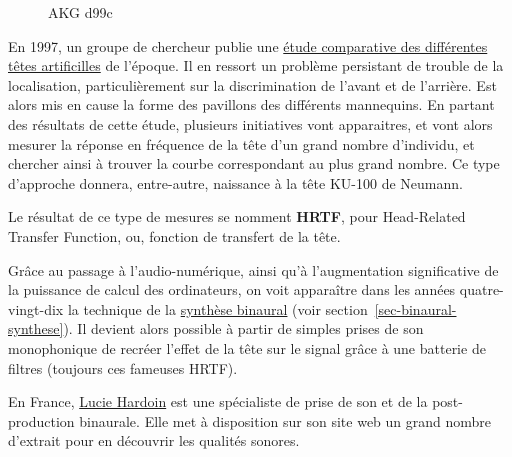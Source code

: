 \documentclass[
  letterpaper,
  DIV=11,
  numbers=noendperiod]{scrreprt}
\begin{document}
\begin{figure}
\begin{minipage}[b]{0.33\linewidth}
{{}

\caption{AKG d99c}

}

\end{minipage}%

\end{figure}

En 1997, un groupe de chercheur publie une
\href{https://www.aes.org/e-lib/browse.cfm?elib=7375}{étude comparative
des différentes têtes artificilles} de l'époque. Il en ressort un
problème persistant de trouble de la localisation, particulièrement sur
la discrimination de l'avant et de l'arrière. Est alors mis en cause la
forme des pavillons des différents mannequins. En partant des résultats
de cette étude, plusieurs initiatives vont apparaitres, et vont alors
mesurer la réponse en fréquence de la tête d'un grand nombre d'individu,
et chercher ainsi à trouver la courbe correspondant au plus grand
nombre. Ce type d'approche donnera, entre-autre, naissance à la tête
KU-100 de Neumann.

\begin{tcolorbox}[enhanced jigsaw, leftrule=.75mm, arc=.35mm, bottomtitle=1mm, colback=white, colbacktitle=quarto-callout-note-color!10!white, opacityback=0, left=2mm, rightrule=.15mm, opacitybacktitle=0.6, breakable, toptitle=1mm, titlerule=0mm, bottomrule=.15mm, toprule=.15mm, coltitle=black, title=\textcolor{quarto-callout-note-color}{\faInfo}\hspace{0.5em}{Note}]

Le résultat de ce type de mesures se nomment \textbf{HRTF}, pour
Head-Related Transfer Function, ou, fonction de transfert de la tête.

\end{tcolorbox}

Grâce au passage à l'audio-numérique, ainsi qu'à l'augmentation
significative de la puissance de calcul des ordinateurs, on voit
apparaître dans les années quatre-vingt-dix la technique de la
\href{https://www.aes.org/e-lib/browse.cfm?elib=8319}{synthèse binaural}
(voir section~\ref{sec-binaural-synthese}). Il devient alors possible à
partir de simples prises de son monophonique de recréer l'effet de la
tête sur le signal grâce à une batterie de filtres (toujours ces
fameuses HRTF).

\begin{tcolorbox}[enhanced jigsaw, leftrule=.75mm, arc=.35mm, bottomtitle=1mm, colback=white, colbacktitle=quarto-callout-tip-color!10!white, opacityback=0, left=2mm, rightrule=.15mm, opacitybacktitle=0.6, breakable, toptitle=1mm, titlerule=0mm, bottomrule=.15mm, toprule=.15mm, coltitle=black, title=\textcolor{quarto-callout-tip-color}{\faLightbulb}\hspace{0.5em}{Astuce}]

En France, \href{https://sonbinaural.com/}{Lucie Hardoin} est une
spécialiste de prise de son et de la post-production binaurale. Elle met
à disposition sur son site web un grand nombre d'extrait pour en
découvrir les qualités sonores.

\end{tcolorbox}
\end{document}
